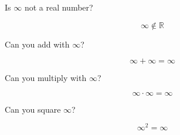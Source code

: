 \documentclass{ximera}
\begin{document}
\begin{question}
Is $\infty$ not a real number?

\[  \infty \notin \mathbb{R}  \]


\begin{multipleChoice}
\end{multipleChoice}


\end{question}










\newpage


\begin{question}
Can you add with $\infty$?

\[  \infty + \infty = \infty \]


\begin{multipleChoice}
\end{multipleChoice}


\end{question}










\begin{question}
Can you multiply with $\infty$?

\[  \infty \cdot \infty = \infty \]


\begin{multipleChoice}
\end{multipleChoice}


\end{question}









\begin{question}
Can you square $\infty$?

\[  \infty^2 = \infty \]


\begin{multipleChoice}
\end{multipleChoice}


\end{question}
\end{document}

